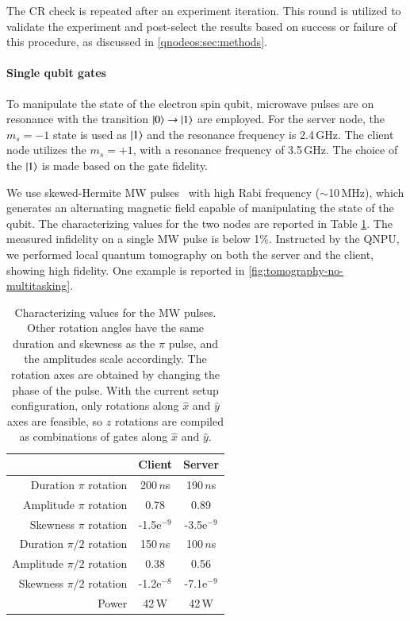 The \ac{CR} check is repeated after an experiment iteration. This round is utilized to validate the experiment and post-select the results based on success or failure of this procedure, as discussed in \cref{qnodeos:sec:methods}.

\paragraph{Single qubit gates}

To manipulate the state of the electron spin qubit, microwave pulses are on resonance with the transition $\ket{0}\rightarrow\ket{1}$ are employed. For the server node, the $m_s=-1$ state is used as $\ket{1}$ and the resonance frequency is 2.4\,GHz. The client node utilizes the $m_s=+1$, with a resonance frequency of 3.5\,GHz. The choice of the $\ket{1}$ is made based on the gate fidelity.

We use skewed-Hermite \acf{MW} pulses~\cite{warren_1984,vandersypen_2005} with high Rabi frequency ($\sim$10\,MHz), which generates an alternating magnetic field capable of manipulating the state of the qubit. The characterizing values for the two nodes are reported in Table \ref{tab:mw_pulse}. The measured infidelity on a single \ac{MW} pulse is below 1\%. Instructed by the \ac{QNPU}, we performed local quantum tomography on both the server and the client, showing high fidelity. One example is reported in \cref{fig:tomography-no-multitasking}.

\begin{table}[]
    \centering
    \begin{tabular}{|r|c|c|}
    \hline
 &Client & Server\\
\hline
        Duration $\pi$ rotation & 200\,$n$s & 190\,$n$s\\
        Amplitude $\pi$ rotation & 0.78 & 0.89\\
        Skewness $\pi$ rotation & -1.5e$^{-9}$ & -3.5e$^{-9}$\\
        Duration $\pi/2$ rotation & 150\,$n$s&  100\,$n$s\\
        Amplitude $\pi/2$ rotation & 0.38 & 0.56\\
        Skewness $\pi/2$ rotation & -1.2e$^{-8}$& -7.1e$^{-9}$ \\
        Power & 42\,W & 42\,W\\
        \hline
    \end{tabular}
    \caption{Characterizing values for the \ac{MW} pulses. Other rotation angles have the same duration and skewness as the $\pi$ pulse, and the amplitudes scale accordingly. The rotation axes are obtained by changing the phase of the pulse. With the current setup configuration, only rotations along $\hat{x}$ and $\hat{y}$ axes are feasible, so $\hat{z}$ rotations are compiled as combinations of gates along $\hat{x}$ and $\hat{y}$.}
    \label{tab:mw_pulse}
\end{table}

